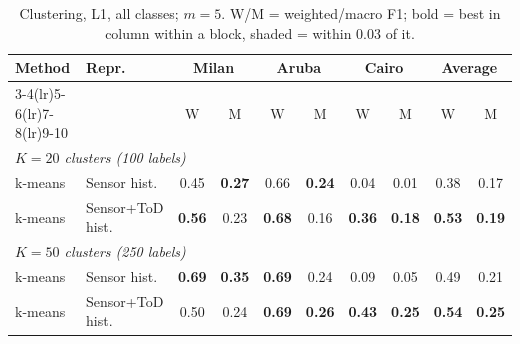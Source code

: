 \begin{table}[H]
\centering\small
\caption{Clustering, L1, all classes; $m=5$. W/M = weighted/macro F1; bold = best in column within a block, shaded = within 0.03 of it.}
\label{tab:clu_l1_all_m5}
\setlength{\tabcolsep}{3.5pt}
\begin{tabular}{llcc|cc|cc|cc}
\toprule
Method & Repr. & \multicolumn{2}{c}{Milan} & \multicolumn{2}{c}{Aruba} & \multicolumn{2}{c}{Cairo} & \multicolumn{2}{c}{Average} \\
\cmidrule(lr){3-4}\cmidrule(lr){5-6}\cmidrule(lr){7-8}\cmidrule(lr){9-10}
 & & W & M & W & M & W & M & W & M \\
\midrule
\multicolumn{10}{l}{\textit{$K = 20$ clusters (100 labels)}} \\
\midrule
k-means & Sensor hist. & 0.45 & \cellcolor{blue!12}\textbf{0.27} & \cellcolor{blue!12}0.66 & \cellcolor{blue!12}\textbf{0.24} & 0.04 & 0.01 & 0.38 & \cellcolor{blue!12}0.17 \\
k-means & Sensor+ToD hist. & \cellcolor{blue!12}\textbf{0.56} & 0.23 & \cellcolor{blue!12}\textbf{0.68} & 0.16 & \cellcolor{blue!12}\textbf{0.36} & \cellcolor{blue!12}\textbf{0.18} & \cellcolor{blue!12}\textbf{0.53} & \cellcolor{blue!12}\textbf{0.19} \\
\midrule
\multicolumn{10}{l}{\textit{$K = 50$ clusters (250 labels)}} \\
\midrule
k-means & Sensor hist. & \cellcolor{blue!12}\textbf{0.69} & \cellcolor{blue!12}\textbf{0.35} & \cellcolor{blue!12}\textbf{0.69} & \cellcolor{blue!12}0.24 & 0.09 & 0.05 & 0.49 & 0.21 \\
k-means & Sensor+ToD hist. & 0.50 & 0.24 & \cellcolor{blue!12}\textbf{0.69} & \cellcolor{blue!12}\textbf{0.26} & \cellcolor{blue!12}\textbf{0.43} & \cellcolor{blue!12}\textbf{0.25} & \cellcolor{blue!12}\textbf{0.54} & \cellcolor{blue!12}\textbf{0.25} \\
\bottomrule
\end{tabular}
\end{table}

